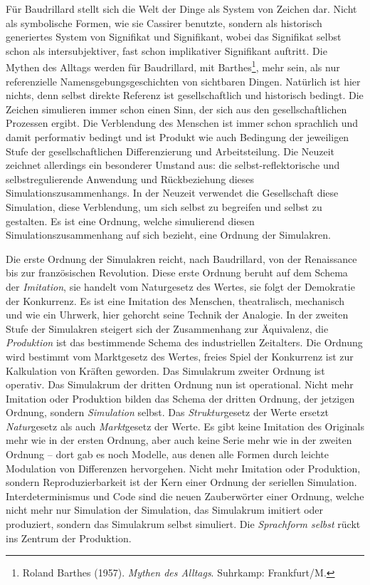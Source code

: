 \documentclass[a4paper,11pt]{article}
\begin{document}
Für Baudrillard stellt sich die Welt der Dinge als System von Zeichen dar.
Nicht als symbolische Formen, wie sie Cassirer benutzte, sondern als
historisch generiertes System von Signifikat und Signifikant, wobei das
Signifikat selbst schon als intersubjektiver, fast schon implikativer
Signifikant auftritt. Die Mythen des Alltags werden für Baudrillard, mit
Barthes\footnote{Roland Barthes (1957). \emph{Mythen des Alltags}. Suhrkamp:
  Frankfurt/M. }, mehr sein, als nur referenzielle Namensgebungsgeschichten
von sichtbaren Dingen. Natürlich ist hier nichts, denn selbst direkte Referenz
ist gesellschaftlich und historisch bedingt. Die Zeichen simulieren immer
schon einen Sinn, der sich aus den gesellschaftlichen Prozessen ergibt. Die
Verblendung des Menschen ist immer schon sprachlich und damit performativ
bedingt und ist Produkt wie auch Bedingung der jeweiligen Stufe der
gesellschaftlichen Differenzierung und Arbeitsteilung. Die Neuzeit zeichnet
allerdings ein besonderer Umstand aus: die selbst-reflektorische und
selbstregulierende Anwendung und Rückbeziehung dieses
Simulationszusammenhangs.  In der Neuzeit verwendet die Gesellschaft diese
Simulation, diese Verblendung, um sich selbst zu begreifen und selbst zu
gestalten. Es ist eine Ordnung, welche simulierend diesen
Simulationszusammenhang auf sich bezieht, eine Ordnung der Simulakren.

Die erste Ordnung der Simulakren reicht, nach Baudrillard, von der Renaissance
bis zur französischen Revolution. Diese erste Ordnung beruht auf dem Schema
der \emph{Imitation}, sie handelt vom Naturgesetz des Wertes, sie folgt der
Demokratie der Konkurrenz. Es ist eine Imitation des Menschen, theatralisch,
mechanisch und wie ein Uhrwerk, hier gehorcht seine Technik der Analogie. In
der zweiten Stufe der Simulakren steigert sich der Zusammenhang zur
Äquivalenz, die \emph{Produktion} ist das bestimmende Schema des industriellen
Zeitalters. Die Ordnung wird bestimmt vom Marktgesetz des Wertes, freies Spiel
der Konkurrenz ist zur Kalkulation von Kräften geworden. Das Simulakrum
zweiter Ordnung ist operativ. Das Simulakrum der dritten Ordnung nun ist
operational.  Nicht mehr Imitation oder Produktion bilden das Schema der
dritten Ordnung, der jetzigen Ordnung, sondern \emph{Simulation} selbst. Das
\emph{Struktur}gesetz der Werte ersetzt \emph{Natur}gesetz als auch
\emph{Markt}gesetz der Werte.  Es gibt keine Imitation des Originals mehr wie
in der ersten Ordnung, aber auch keine Serie mehr wie in der zweiten Ordnung
-- dort gab es noch Modelle, aus denen alle Formen durch leichte Modulation
von Differenzen hervorgehen. Nicht mehr Imitation oder Produktion, sondern
Reproduzierbarkeit ist der Kern einer Ordnung der seriellen Simulation.
Interdeterminismus und Code sind die neuen Zauberwörter einer Ordnung, welche
nicht mehr nur Simulation der Simulation, das Simulakrum imitiert oder
produziert, sondern das Simulakrum selbst simuliert. Die \emph{Sprachform
  selbst} rückt ins Zentrum der Produktion.
\end{document}
